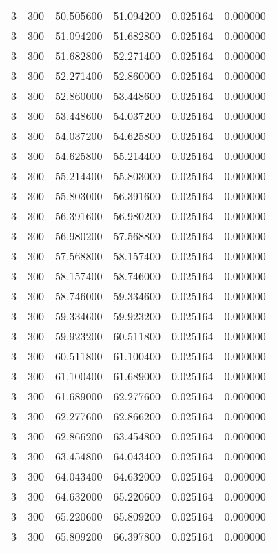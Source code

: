 \begin{longtable}{rrrrrr}
3 & 300 & 50.505600 & 51.094200 & 0.025164 & 0.000000 \\
3 & 300 & 51.094200 & 51.682800 & 0.025164 & 0.000000 \\
3 & 300 & 51.682800 & 52.271400 & 0.025164 & 0.000000 \\
3 & 300 & 52.271400 & 52.860000 & 0.025164 & 0.000000 \\
3 & 300 & 52.860000 & 53.448600 & 0.025164 & 0.000000 \\
3 & 300 & 53.448600 & 54.037200 & 0.025164 & 0.000000 \\
3 & 300 & 54.037200 & 54.625800 & 0.025164 & 0.000000 \\
3 & 300 & 54.625800 & 55.214400 & 0.025164 & 0.000000 \\
3 & 300 & 55.214400 & 55.803000 & 0.025164 & 0.000000 \\
3 & 300 & 55.803000 & 56.391600 & 0.025164 & 0.000000 \\
3 & 300 & 56.391600 & 56.980200 & 0.025164 & 0.000000 \\
3 & 300 & 56.980200 & 57.568800 & 0.025164 & 0.000000 \\
3 & 300 & 57.568800 & 58.157400 & 0.025164 & 0.000000 \\
3 & 300 & 58.157400 & 58.746000 & 0.025164 & 0.000000 \\
3 & 300 & 58.746000 & 59.334600 & 0.025164 & 0.000000 \\
3 & 300 & 59.334600 & 59.923200 & 0.025164 & 0.000000 \\
3 & 300 & 59.923200 & 60.511800 & 0.025164 & 0.000000 \\
3 & 300 & 60.511800 & 61.100400 & 0.025164 & 0.000000 \\
3 & 300 & 61.100400 & 61.689000 & 0.025164 & 0.000000 \\
3 & 300 & 61.689000 & 62.277600 & 0.025164 & 0.000000 \\
3 & 300 & 62.277600 & 62.866200 & 0.025164 & 0.000000 \\
3 & 300 & 62.866200 & 63.454800 & 0.025164 & 0.000000 \\
3 & 300 & 63.454800 & 64.043400 & 0.025164 & 0.000000 \\
3 & 300 & 64.043400 & 64.632000 & 0.025164 & 0.000000 \\
3 & 300 & 64.632000 & 65.220600 & 0.025164 & 0.000000 \\
3 & 300 & 65.220600 & 65.809200 & 0.025164 & 0.000000 \\
3 & 300 & 65.809200 & 66.397800 & 0.025164 & 0.000000 \\

\end{longtable}
